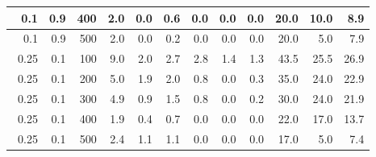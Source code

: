 \begin{longtable}{|r|r|r|r|r|r|r|r|r|r|r|r|}
    \hline \
    0.1                           & 0.9                     & 400                       & 2.0                       & 0.0                       & 0.6                       & 0.0                       & 0.0                       & 0.0                       & 20.0                      & 10.0                      & 8.9                      \\
    \hline \
    0.1                           & 0.9                     & 500                       & 2.0                       & 0.0                       & 0.2                       & 0.0                       & 0.0                       & 0.0                       & 20.0                      & 5.0                      & 7.9                      \\
    \hline \
    0.25                           & 0.1                     & 100                       & 9.0                       & 2.0                       & 2.7                       & 2.8                       & 1.4                       & 1.3                       & 43.5                      & 25.5                      & 26.9                      \\
    \hline \
    0.25                           & 0.1                     & 200                       & 5.0                       & 1.9                       & 2.0                       & 0.8                       & 0.0                       & 0.3                       & 35.0                      & 24.0                      & 22.9                      \\
    \hline \
    0.25                           & 0.1                     & 300                       & 4.9                       & 0.9                       & 1.5                       & 0.8                       & 0.0                       & 0.2                       & 30.0                      & 24.0                       & 21.9                       \\
    \hline \
    0.25                           & 0.1                    & 400                       & 1.9                       & 0.4                       & 0.7                       & 0.0                       & 0.0                       & 0.0                       & 22.0                      & 17.0                      & 13.7                      \\
    \hline \
    0.25                           & 0.1                    & 500                       & 2.4                       & 1.1                       & 1.1                       & 0.0                       & 0.0                       & 0.0                       & 17.0                      & 5.0                      & 7.4                      \\

\end{longtable}
